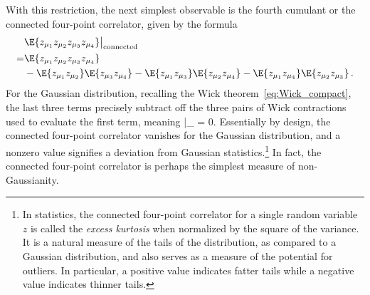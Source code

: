 With this restriction, the next simplest observable is the fourth cumulant or the connected four-point correlator, given by the formula
\begin{align}\label{eq:C4}
&\E{z_{\mu_1} z_{\mu_2}z_{\mu_3}z_{\mu_4}}\big|_{\text{connected}}\, \\
=&\E{z_{\mu_1} z_{\mu_2}z_{\mu_3}z_{\mu_4}}\,\nonumber\\
&-\E{z_{\mu_1} z_{\mu_2}}\E{z_{\mu_3} z_{\mu_4}}-\E{z_{\mu_1} z_{\mu_3}}\E{z_{\mu_2} z_{\mu_4}}-\E{z_{\mu_1} z_{\mu_4}}\E{z_{\mu_2} z_{\mu_3}}\, .\nonumber
\end{align}
For the Gaussian distribution, recalling the Wick theorem~\eqref{eq:Wick_compact}, the last three terms precisely subtract off the three pairs of Wick contractions used to evaluate the first term, meaning
\be\label{eq:C4-gaussian}
\big|_{} = 0. 
\ee
Essentially by design, the connected four-point correlator vanishes for the Gaussian distribution, and a nonzero value signifies a deviation from Gaussian statistics.\footnote{In statistics, the connected four-point correlator for a single random variable $z$ is called the \emph{excess kurtosis} when normalized by the square of the variance. It is a natural measure of the tails of the distribution, as compared to a Gaussian distribution, and also serves as a measure of the potential for outliers. In particular, a positive value indicates fatter tails while a negative value indicates thinner tails.\label{footnote-kurtosis}} 
In fact, the connected four-point correlator is perhaps the simplest measure of non-Gaussianity.


